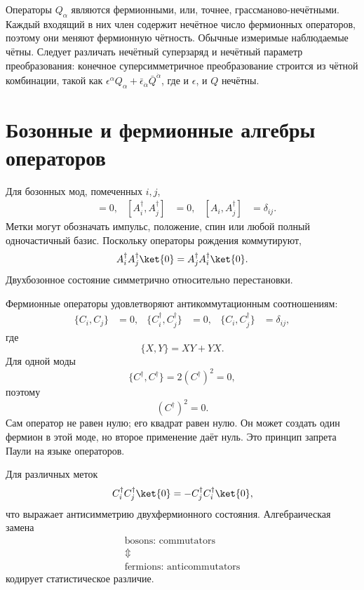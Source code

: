 Операторы \(Q_\alpha\) являются фермионными, или, точнее, грассманово-нечётными. Каждый входящий в них член содержит нечётное число фермионных операторов, поэтому они меняют фермионную чётность. Обычные измеримые наблюдаемые чётны. Следует различать нечётный суперзаряд и нечётный параметр преобразования: конечное суперсимметричное преобразование строится из чётной комбинации, такой как \(\epsilon^\alpha Q_\alpha+\bar\epsilon_{\dot\alpha}\bar Q^{\dot\alpha}\), где и \(\epsilon\), и \(Q\) нечётны. 

\section{Бозонные и фермионные алгебры операторов}

Для бозонных мод, помеченных \(i,j\),
\begin{align}
[A_i,A_j]&=0,&
[A_i^\dagger,A_j^\dagger]&=0,&
[A_i,A_j^\dagger]&=\delta_{ij}.
\end{align}
Метки могут обозначать импульс, положение, спин или любой полный одночастичный базис. Поскольку операторы рождения коммутируют,
\begin{equation}
A_i^\dagger A_j^\dagger\ket{0}
=A_j^\dagger A_i^\dagger\ket{0}.
\end{equation}
Двухбозонное состояние симметрично относительно перестановки.

Фермионные операторы удовлетворяют антикоммутационным соотношениям:
\begin{align}
\{C_i,C_j\}&=0,&
\{C_i^\dagger,C_j^\dagger\}&=0,&
\{C_i,C_j^\dagger\}&=\delta_{ij},
\end{align}
где
\begin{equation}
\{X,Y\}=XY+YX.
\end{equation}
Для одной моды
\begin{equation}
\{C^\dagger,C^\dagger\}=2(C^\dagger)^2=0,
\end{equation}
поэтому
\begin{equation}
(C^\dagger)^2=0.
\end{equation}
Сам оператор не равен нулю; его квадрат равен нулю. Он может создать один фермион в этой моде, но второе применение даёт нуль. Это принцип запрета Паули на языке операторов.

Для различных меток
\begin{equation}
C_i^\dagger C_j^\dagger\ket{0}
=-C_j^\dagger C_i^\dagger\ket{0},
\end{equation}
что выражает антисимметрию двухфермионного состояния. Алгебраическая замена
\begin{equation}
\begin{gathered}
\text{bosons: commutators}\\
\Updownarrow\\
\text{fermions: anticommutators}
\end{gathered}
\end{equation}
кодирует статистическое различие.

